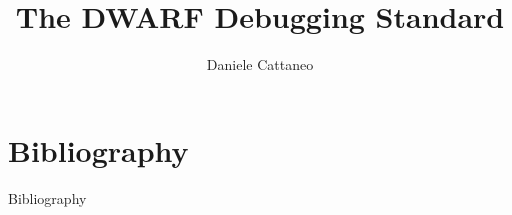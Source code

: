 

\author{Daniele Cattaneo}
\date{\DATE}
\title{The DWARF Debugging Standard}
\newcommand{\customdata}{Daniele Cattaneo <daniele.cattaneo@polimi.it>}





\begin{frame}
\maketitle
\end{frame}





\section*{Bibliography}
\begin{frame}[allowframebreaks]{Bibliography}
\nocite{*}


\end{frame}


